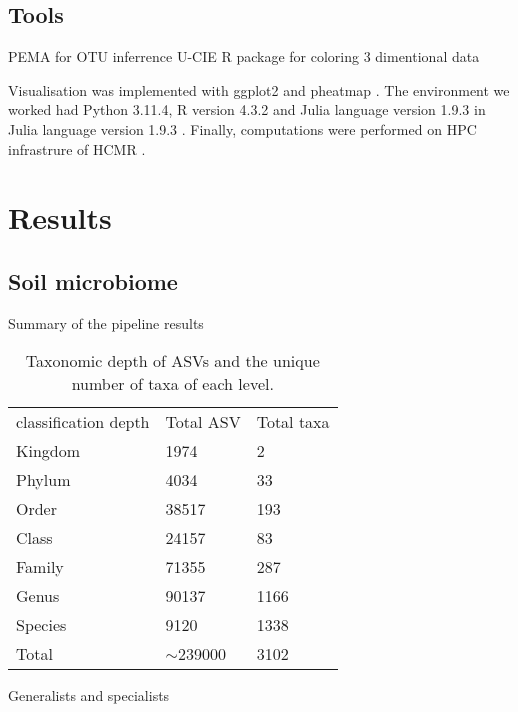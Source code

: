 \subsection{Tools}\label{Coding environment}
PEMA for OTU inferrence \parencite{zafeiropoulos2020pema}
U-CIE R package for coloring 3 dimentional data \parencite{Koutrouli2022}

Visualisation was implemented with ggplot2 \parencite{wickham_ggplot2_2016} and pheatmap \parencite{Kolde2019}.
The environment we worked had Python 3.11.4, R version 4.3.2 \parencite{rcoreteam}
and Julia language version 1.9.3 \parencite{Julia-2017}in Julia language version 1.9.3 \parencite{Julia-2017}.
Finally, computations were performed on HPC infrastrure of HCMR \parencite{zafeiropoulos_0s_2021}.

\section{Results}\label{results}

\subsection{Soil microbiome}\label{soil_microbiome}

Summary of the pipeline results

\begin{table}[]
    \caption{Taxonomic depth of ASVs and the unique number of taxa of each level.\label{table:asv_taxonomy}}%
\begin{tabular}{@{}lll@{}}
classification depth & Total ASV    & Total taxa \\
Kingdom              & 1974         & 2          \\
Phylum               & 4034         & 33         \\
Order                & 38517        & 193        \\
Class                & 24157        & 83         \\
Family               & 71355        & 287        \\
Genus                & 90137        & 1166       \\
Species              & 9120         & 1338       \\
Total                & $\sim$239000 & 3102      
\end{tabular}
\label{table:asv_taxonomy}
\end{table}
Generalists and specialists


